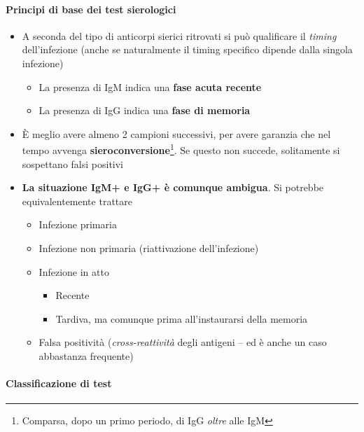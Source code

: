 \documentclass[italian,]{article}
\providecommand{\tightlist}{%
  \setlength{\itemsep}{0pt}\setlength{\parskip}{0pt}}
\begin{document}
\hypertarget{principi-di-base-dei-test-sierologici}{%
\paragraph{Principi di base dei test
sierologici}\label{principi-di-base-dei-test-sierologici}}

\begin{itemize}
\tightlist
\item
  A seconda del tipo di anticorpi sierici ritrovati si può qualificare
  il \emph{timing} dell'infezione (anche se naturalmente il timing
  specifico dipende dalla singola infezione)

  \begin{itemize}
  \tightlist
  \item
    La presenza di IgM indica una \textbf{fase acuta recente}
  \item
    La presenza di IgG indica una \textbf{fase di memoria}
  \end{itemize}
\item
  È meglio avere almeno 2 campioni successivi, per avere garanzia che
  nel tempo avvenga \textbf{sieroconversione}\footnote{Comparsa, dopo un
    primo periodo, di IgG \emph{oltre} alle IgM}. Se questo non succede,
  solitamente si sospettano falsi positivi
\item
  \textbf{La situazione IgM+ e IgG+ è comunque ambigua}. Si potrebbe
  equivalentemente trattare

  \begin{itemize}
  \tightlist
  \item
    Infezione primaria
  \item
    Infezione non primaria (riattivazione dell'infezione)
  \item
    Infezione in atto

    \begin{itemize}
    \tightlist
    \item
      Recente
    \item
      Tardiva, ma comunque prima all'instaurarsi della memoria
    \end{itemize}
  \item
    Falsa positività (\emph{cross-reattività} degli antigeni -- ed è
    anche un caso abbastanza frequente)
  \end{itemize}
\end{itemize}

\hypertarget{classificazione-di-test}{%
\paragraph{Classificazione di test}\label{classificazione-di-test}}
\end{document}
